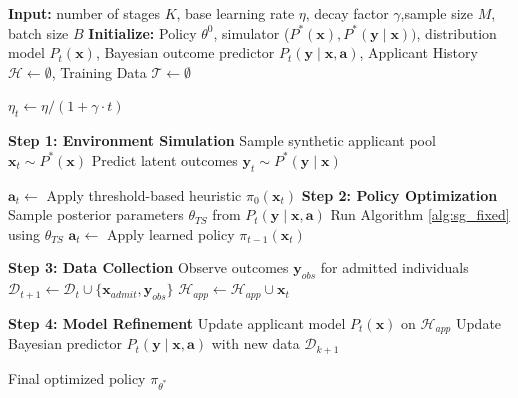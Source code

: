 \documentclass[acmlarge]{acmart-ecaf}
\newcommand {\Pfeat} {\mathbf{x}}
\newcommand {\Pact} {\mathbf{a}}
\newcommand {\Pout} {\mathbf{y}}
\begin{document}
\begin{algorithm}[H]
\caption{Multi-Stage Policy Gradient with Dynamic Updates}
\label{alg:sg_1}
\begin{algorithmic}[1]

\State \textbf{Input:}  number of stages $K$, base learning rate $\eta$, decay factor $\gamma$,sample size $M$, batch size $B$
\State \textbf{Initialize:} Policy $\theta^0$, simulator ($P^*(\Pfeat),P^*(\Pout \mid \Pfeat)) $, distribution model $P_t(\Pfeat)$, Bayesian outcome predictor $P_t(\Pout \mid \Pfeat, \Pact)$, Applicant History $\mathcal{H} \leftarrow \emptyset$, Training Data $\mathcal{T} \leftarrow \emptyset$

    \State $\eta_t \leftarrow \eta / (1 + \gamma \cdot t)$ 
    
    \State \textbf{Step 1: Environment Simulation}
    \State Sample synthetic applicant pool $\Pfeat_t \sim P^*(\Pfeat)$
    \State Predict latent outcomes $\Pout_t \sim P^*(\Pout \mid \Pfeat)$
    
    

    
        \State $\Pact_t \leftarrow$ Apply threshold-based heuristic $\pi_0(\Pfeat_t)$
    \Else
        \State \textbf{Step 2: Policy Optimization }
        \State Sample posterior parameters $\theta_{TS}$ from $P_t(\Pout \mid \Pfeat, \Pact)$ 
        \State Run Algorithm \ref{alg:sg_fixed} using $\theta_{TS}$
        \State $\Pact_t \leftarrow$ Apply learned policy $\pi_{t-1}(\Pfeat_t)$
    \EndIf
    
    \State \textbf{Step 3:  Data Collection}
    \State Observe outcomes $\Pout_{obs}$ for admitted individuals
    \State $\mathcal{D}_{t+1} \leftarrow \mathcal{D}_t \cup \{\Pfeat_{admit}, \Pout_{obs}\}$
    \State $\mathcal{H}_{app} \leftarrow \mathcal{H}_{app} \cup \Pfeat_{t}$ 
    
    \State \textbf{Step 4: Model Refinement}
    \State Update applicant model $P_t(\Pfeat)$ on $\mathcal{H}_{app}$
    \State Update Bayesian predictor $P_t(\Pout \mid \Pfeat, \Pact)$ with new data $\mathcal{D}_{k+1}$
\EndFor

\State \Return Final optimized policy $\pi_{\theta^*}$

\end{algorithmic}
\end{algorithm}
\end{document}
